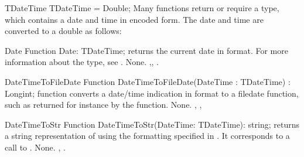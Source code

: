 \begin{type}{TDateTime}
\Declaration
  TDateTime = Double;
\Description
Many functions return or require a  type, which contains
a date and time in encoded form. The date and time are converted to a double
as follows:
\end{type}

\begin{function}{Date}
\Declaration
Function Date: TDateTime;
\Description
{} returns the current date in  format. 
For more information about the  type, see .
\Errors
None.
\SeeAlso
{},, .
\end{function}

\html{}

\begin{function}{DateTimeToFileDate}
\Declaration
Function DateTimeToFileDate(DateTime : TDateTime) : Longint;
\Description
{} function converts a date/time indication in
 format to a filedate function, such as returned for 
instance by the  function.
\Errors
None.
\SeeAlso
{}, , 
\end{function}

\html{}
 
\begin{function}{DateTimeToStr}
\Declaration
Function DateTimeToStr(DateTime: TDateTime): string;
\Description
{} returns a string representation of 
 using the formatting specified in
. It corresponds to a call to 
.
\Errors
None.
\SeeAlso
{}, .
\end{function}

\html{}
 

